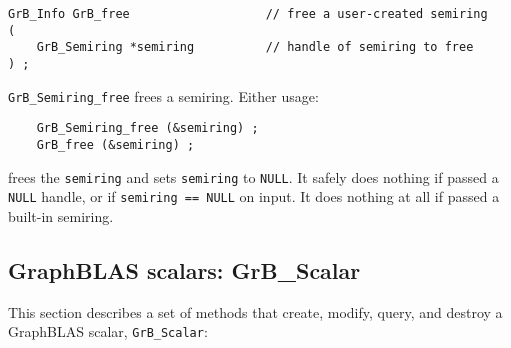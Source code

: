 \documentclass[12pt]{article}
\begin{document}
{\begin{mdframed}[userdefinedwidth=6in]
{\footnotesize
\begin{verbatim}
GrB_Info GrB_free                   // free a user-created semiring
(
    GrB_Semiring *semiring          // handle of semiring to free
) ;
\end{verbatim}
} \end{mdframed}

\verb'GrB_Semiring_free' frees a semiring.  Either usage:

    {\small
    \begin{verbatim}
    GrB_Semiring_free (&semiring) ;
    GrB_free (&semiring) ; \end{verbatim}}

\noindent
frees the \verb'semiring' and sets \verb'semiring' to \verb'NULL'.  It safely
does nothing if passed a \verb'NULL' handle, or if \verb'semiring == NULL' on
input.  It does nothing at all if passed a built-in semiring.

\newpage
\subsection{GraphBLAS scalars: {\sf GrB\_Scalar}} %
\label{scalar}

This section describes a set of methods that create, modify, query,
and destroy a GraphBLAS scalar, \verb'GrB_Scalar':

}
\end{document}
